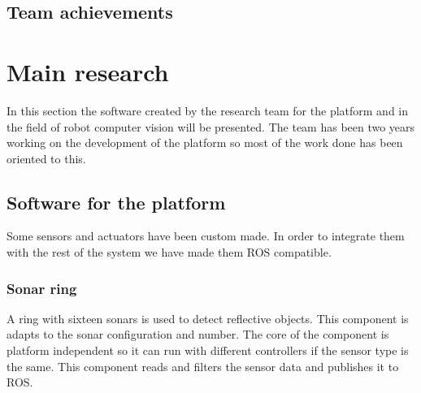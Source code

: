 %
\subsection{Team achievements}



%
\section{Main research}
In this section the software created by the research team for the platform and in the field of robot computer vision will be presented.
The team has been two years working on the development of the platform so most of the work done has been oriented to this.

\subsection{Software for the platform}
Some sensors and actuators have been custom made.
In order to integrate them with the rest of the system we have made them ROS compatible.
\subsubsection{Sonar ring}
A ring with sixteen sonars is used to detect reflective objects.
This component is adapts to the sonar configuration and number.
The core of the component is platform independent so it can run with different controllers if the sensor type is the same.
This component reads and filters the sensor data and publishes it to ROS.

